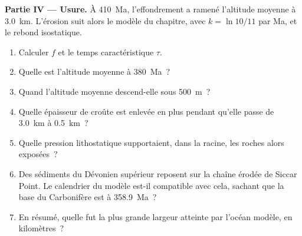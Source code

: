 \begin{problem}
\noindent\textbf{Partie IV --- Usure.} À \qty{410}{Ma}, l'effondrement a ramené l'altitude moyenne à
\qty{3.0}{km}. L'érosion suit alors le modèle du chapitre, avec $k = \ln
10/11$ par Ma, et le rebond isostatique.
\begin{enumerate}[resume]
\item Calculer $f$ et le temps caractéristique $\tau$.
\item Quelle est l'altitude moyenne à \qty{380}{Ma}~?
\item Quand l'altitude moyenne descend-elle sous \qty{500}{m}~?
\item Quelle épaisseur de croûte est enlevée en plus pendant qu'elle passe de \qty{3.0}{km} à \qty{0.5}{km}~?
\item Quelle pression lithostatique supportaient, dans la racine, les roches alors exposées~?
\item Des sédiments du Dévonien supérieur reposent sur la chaîne érodée de Siccar Point. Le calendrier du modèle est-il
compatible avec cela, sachant que la base du Carbonifère est à \qty{358.9}{Ma}~?
\item En résumé, quelle fut la plus grande largeur atteinte par l'océan modèle, en kilomètres~?
\end{enumerate}
\end{problem}
